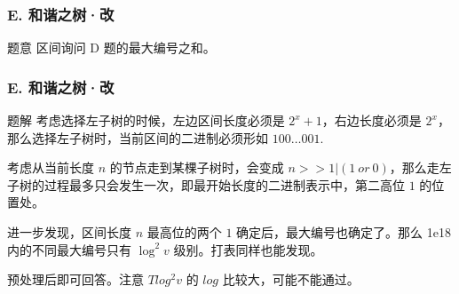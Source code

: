 \renewcommand{\problemname}{E. 和谐之树·改}

\begin{frame}\frametitle{\problemname}

    \begin{block}{题意}
        区间询问 D 题的最大编号之和。
    \end{block}

\end{frame}

\begin{frame}\frametitle{\problemname}
	\begin{block}{题解}
        考虑选择左子树的时候，左边区间长度必须是 $2^x+1$，右边长度必须是 $2^x$，那么选择左子树时，当前区间的二进制必须形如 $100\dots001$.

        考虑从当前长度 $n$ 的节点走到某棵子树时，会变成 $n>>1|(1 \ or \ 0)$，那么走左子树的过程最多只会发生一次，即最开始长度的二进制表示中，第二高位 $1$ 的位置处。

        进一步发现，区间长度 $n$ 最高位的两个 $1$ 确定后，最大编号也确定了。那么 1e18 内的不同最大编号只有 $\log^2v$ 级别。打表同样也能发现。

        预处理后即可回答。注意 $T log^2 v$ 的 $log$ 比较大，可能不能通过。
    \end{block}
\end{frame}